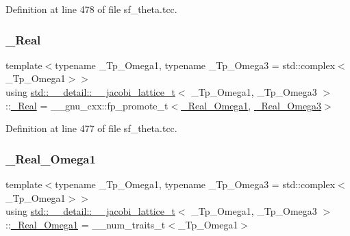 Definition at line 478 of file sf\+\_\+theta.\+tcc.

\mbox{\label{structstd_1_1____detail_1_1____jacobi__lattice__t_afdf4a474bd195f7b6062b4782202adc7}} 
\subsubsection{\texorpdfstring{\+\_\+\+Real}{\_Real}}
{\footnotesize\ttfamily template$<$typename \+\_\+\+Tp\+\_\+\+Omega1, typename \+\_\+\+Tp\+\_\+\+Omega3 = std\+::complex$<$\+\_\+\+Tp\+\_\+\+Omega1$>$$>$ \\
using \hyperlink{structstd_1_1____detail_1_1____jacobi__lattice__t}{std\+::\+\_\+\+\_\+detail\+::\+\_\+\+\_\+jacobi\+\_\+lattice\+\_\+t}$<$ \+\_\+\+Tp\+\_\+\+Omega1, \+\_\+\+Tp\+\_\+\+Omega3 $>$\+::\hyperlink{structstd_1_1____detail_1_1____jacobi__lattice__t_afdf4a474bd195f7b6062b4782202adc7}{\+\_\+\+Real} =  \+\_\+\+\_\+gnu\+\_\+cxx\+::fp\+\_\+promote\+\_\+t$<$\hyperlink{structstd_1_1____detail_1_1____jacobi__lattice__t_abf268d5ebea22a011ad5d89dd5781eab}{\+\_\+\+Real\+\_\+\+Omega1}, \hyperlink{structstd_1_1____detail_1_1____jacobi__lattice__t_a7f2828706e5ac28bddfb0a8e44c1fed3}{\+\_\+\+Real\+\_\+\+Omega3}$>$}



Definition at line 477 of file sf\+\_\+theta.\+tcc.

\mbox{\label{structstd_1_1____detail_1_1____jacobi__lattice__t_abf268d5ebea22a011ad5d89dd5781eab}} 
\subsubsection{\texorpdfstring{\+\_\+\+Real\+\_\+\+Omega1}{\_Real\_Omega1}}
{\footnotesize\ttfamily template$<$typename \+\_\+\+Tp\+\_\+\+Omega1, typename \+\_\+\+Tp\+\_\+\+Omega3 = std\+::complex$<$\+\_\+\+Tp\+\_\+\+Omega1$>$$>$ \\
using \hyperlink{structstd_1_1____detail_1_1____jacobi__lattice__t}{std\+::\+\_\+\+\_\+detail\+::\+\_\+\+\_\+jacobi\+\_\+lattice\+\_\+t}$<$ \+\_\+\+Tp\+\_\+\+Omega1, \+\_\+\+Tp\+\_\+\+Omega3 $>$\+::\hyperlink{structstd_1_1____detail_1_1____jacobi__lattice__t_abf268d5ebea22a011ad5d89dd5781eab}{\+\_\+\+Real\+\_\+\+Omega1} =  \+\_\+\+\_\+num\+\_\+traits\+\_\+t$<$\+\_\+\+Tp\+\_\+\+Omega1$>$}



